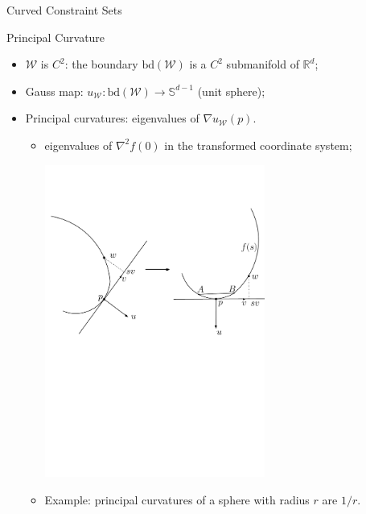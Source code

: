 \documentclass[final]{beamer} %
\newcommand{\cW}{\mathcal{W}}
\newcommand{\bd}{\mathrm{bd}}
\newcommand{\R}{\mathbb{R}}
\newcommand{\bS}{\mathbb{S}}
\begin{document}
\begin{frame}[c]
\begin{columns}[t,totalwidth=\textwidth]
\begin{column}{.32\textwidth}
		\begin{block}{Curved Constraint Sets}			
			\begin{minipage}{.9\linewidth}
			\vspace{-0.5cm}
					\begin{block}{Principal Curvature}
						\vspace{-1.5cm}
						\begin{itemize}
						\item $\cW$ is $C^2$: the boundary $\bd(\cW)$ is a $C^2$ submanifold of $\R^d$;
						\item Gauss map: $u_{\cW} : \bd(\cW) \to \bS^{d-1}$  (unit sphere);
						\item Principal curvatures: eigenvalues of  $\nabla u_{\cW}(p)$.
						\begin{itemize}
							\item eigenvalues of $\nabla^2 f(0)$ in the transformed coordinate system;
							\bigskip
							\begin{center}
								\hspace{-1cm}\includegraphics[width=0.6\textwidth]{figures/stronglyconvexset}
							\end{center}
							\smallskip
							\item Example: principal curvatures of a sphere with radius $r$ are $1/r$.

\end{itemize}
\end{itemize}
\end{block}
\end{minipage}
\end{block}
\end{column}
\end{columns}
\end{frame}
\end{document}
